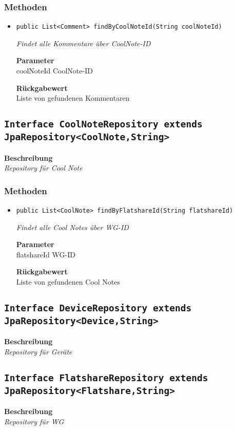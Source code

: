     \subsubsection{Methoden}
    \begin{itemize}
    	\item{\texttt{public List<Comment> findByCoolNoteId(String coolNoteId)}}
    	
    	\textit{Findet alle Kommentare über CoolNote-ID}
    	
    	\textbf{Parameter} \\
    	coolNoteId CoolNote-ID
    	
    	\textbf{Rückgabewert} \\
    	Liste von gefundenen Kommentaren
    \end{itemize}
    \subsection{\texttt{Interface CoolNoteRepository extends JpaRepository<CoolNote,String>}}
    \textbf{Beschreibung} \\
    \textit{Repository für Cool Note}
    \subsubsection{Methoden}
    \begin{itemize}
    	\item{\texttt{public List<CoolNote> findByFlatshareId(String flatshareId)}}
    	
    	\textit{Findet alle Cool Notes über WG-ID}
    	
    	\textbf{Parameter} \\
    	flatshareId WG-ID
    	
    	\textbf{Rückgabewert} \\
    	Liste von gefundenen Cool Notes
    \end{itemize}
    \subsection{\texttt{Interface DeviceRepository extends JpaRepository<Device,String>}}
    \textbf{Beschreibung} \\
    \textit{Repository für Geräte}
    \subsection{\texttt{Interface FlatshareRepository extends JpaRepository<Flatshare,String>}}
    \textbf{Beschreibung} \\
    \textit{Repository für WG}
